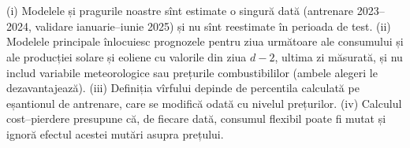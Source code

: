 \section{}
%
{(i) Modelele și pragurile noastre sînt estimate o singură dată (antrenare 2023--2024, validare ianuarie--iunie 2025) și nu sînt reestimate în perioada de test. (ii) Modelele principale înlocuiesc prognozele pentru ziua următoare ale consumului și ale producției solare și eoliene cu valorile din ziua $d-2$, ultima zi măsurată, și nu includ variabile meteorologice sau prețurile combustibililor (ambele alegeri le dezavantajează).
(iii) Definiția vîrfului depinde de percentila calculată pe eșantionul de antrenare, care se modifică odată cu nivelul prețurilor. (iv) Calculul cost--pierdere presupune că, de fiecare dată, consumul flexibil poate fi mutat și ignoră efectul acestei mutări asupra prețului.}

\newpage
